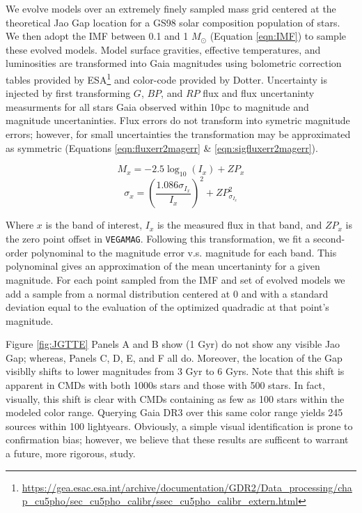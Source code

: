 We evolve models over an extremely finely sampled mass grid centered at the
theoretical Jao Gap location for a GS98 solar composition population of stars.
We then adopt the \citep{Sollima2019} IMF between 0.1 and 1 $M_{\odot}$
(Equation \ref{eqn:IMF}) to sample these evolved models. Model surface
gravities, effective temperatures, and luminosities are transformed into Gaia
magnitudes using bolometric correction tables provided by
ESA\footnote{\url{https://gea.esac.esa.int/archive/documentation/GDR2/Data\_processing/chap\_cu5pho/sec\_cu5pho\_calibr/ssec\_cu5pho\_calibr\_extern.html}}
and color-code provided by Dotter. Uncertainty is injected by first
transforming $G$, $BP$, and $RP$ flux and flux uncertaninty measurments for all
stars Gaia observed within 10pc to magnitude and magnitude uncertaninties. Flux
errors do not transform into symetric magnitude errors; however, for small
uncertainties the transformation may be approximated as symmetric (Equations
\ref{eqn:fluxerr2magerr} \& \ref{eqn:sigfluxerr2magerr}).

\begin{equation}\label{eqn:fluxerr2magerr}
	M_{x} = -2.5\log_{10}(I_{x}) + ZP_{x}
\end{equation}
\begin{equation}\label{eqn:sigfluxerr2magerr}
	\sigma_{x} = \left(\frac{1.086\sigma_{I_{x}}}{I_{x}}\right)^{2} + ZP_{\sigma_{I_{x}}}^{2}
\end{equation}

Where $x$ is the band of interest, $I_{x}$ is the measured flux in that band,
and $ZP_{x}$ is the zero point offset in \texttt{VEGAMAG}. Following this
transformation, we fit a second-order polynominal to the magnitude error v.s.
magnitude for each band. This polynominal gives an approximation of the mean
uncertaninty for a given magnitude. For each point sampled from the IMF and set
of evolved models we add a sample from a normal distribution centered at 0 and
with a standard deviation equal to the evaluation of the optimized quadradic at
that point's magnitude.

Figure \ref{fig:JGTTE} Panels A and B show (1 Gyr) do not show any visible Jao
Gap; whereas, Panels C, D, E, and F all do. Moreover, the location of the Gap
visiblly shifts to lower magnitudes from 3 Gyr to 6 Gyrs. Note that this shift
is apparent in CMDs with both 1000s stars and those with 500 stars. In fact,
visually, this shift is clear with CMDs containing as few as 100 stars within
the modeled color range. Querying Gaia DR3 over this same color range yields
245 sources within 100 lightyears.  Obviously, a simple visual identification
is prone to confirmation bias; however, we believe that these results are
sufficent to warrant a future, more rigorous, study.


